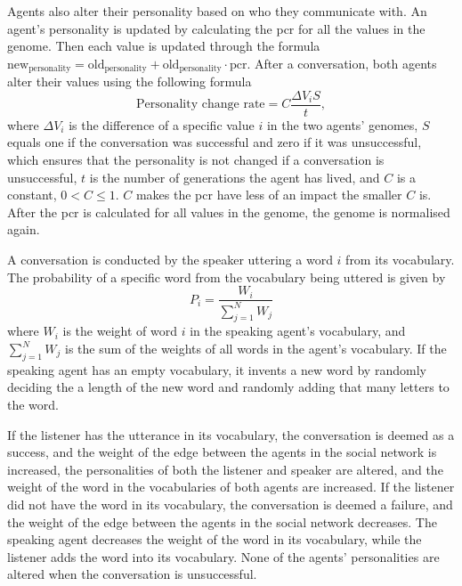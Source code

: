Agents also alter their personality based on who they communicate with. An agent's personality is updated by calculating the \ac{pcr} for all the values in the genome. Then each value is updated through the formula $\mathrm{new_{personality}} = \mathrm{old_{personality}} + \mathrm{old_{personality}} \cdot \mathrm{pcr}$. After a conversation, both agents alter their values using the following formula
\begin{equation}\label{eq:PCR}
\text{Personality change rate} = C\frac{\Delta V_i S}{t},
\end{equation}
where $\Delta V_i$ is the difference of a specific value $i$ in the two agents' genomes, $S$ equals one if the conversation was successful and zero if it was unsuccessful, which ensures that the personality is not changed if a conversation is unsuccessful, $t$ is the number of generations the agent has lived, and $C$ is a constant, $0 < C \leq 1$. $C$ makes the \ac{pcr} have less of an impact the smaller $C$ is. After the \ac{pcr} is calculated for all values in the genome, the genome is normalised again.

A conversation is conducted by the speaker uttering a word $i$ from its vocabulary. The probability of a specific word from the vocabulary being uttered is given by
\begin{equation}\label{eq:chooseWordprob}
P_{i} = \frac{W_{i}}{\sum_{j=1}^{N}W_{j}}
\end{equation}
where $W_{i}$ is the weight of word $i$ in the speaking agent's vocabulary, and $\sum_{j=1}^{N}W_{j}$ is the sum of the weights of all words in the agent's vocabulary. If the speaking agent has an empty vocabulary, it invents a new word by randomly deciding the a length of the new word and randomly adding that many letters to the word. 

If the listener has the utterance in its vocabulary, the conversation is deemed as a success, and the weight of the edge between the agents in the social network is increased, the personalities of both the listener and speaker are altered, and the weight of the word in the vocabularies of both agents are increased. If the listener did not have the word in its vocabulary, the conversation is deemed a failure, and the weight of the edge between the agents in the social network decreases. The speaking agent decreases the weight of the word in its vocabulary, while the listener adds the word into its vocabulary. None of the agents' personalities are altered when the conversation is unsuccessful.

